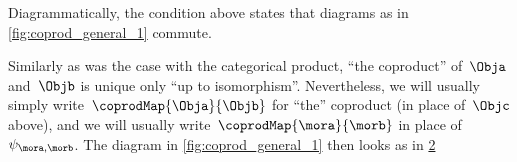 \begin{remark}
	Diagrammatically, the condition above states that diagrams as in \cref{fig:coprod_general_1} commute.
	\begin{figure}[h!]
		\centering
		\caption{}
		\label{fig:coprod_general_1}
		\label{fig:def-coproduct-diagram}
	\end{figure}
	Similarly as was the case with the categorical product, ``the coproduct'' of~$\Obja$ and~$\Objb$ is unique only ``up to isomorphism''.
	Nevertheless, we will usually simply write~$\coprodMap{\Obja}{\Objb}$ for ``the'' coproduct (in place of~$\Objc$ above), and we will usually write~$\coprodMap{\mora}{\morb}$ in place of~$\psi_{\mora, \morb}$.
	The diagram in \cref{fig:coprod_general_1} then looks as in \cref{fig:def-coproduct-diagram-generic}
\end{remark}

\begin{figure}
	\centering
	\caption{}
	\label{fig:def-coproduct-diagram-generic}
\end{figure}
%
%

%



